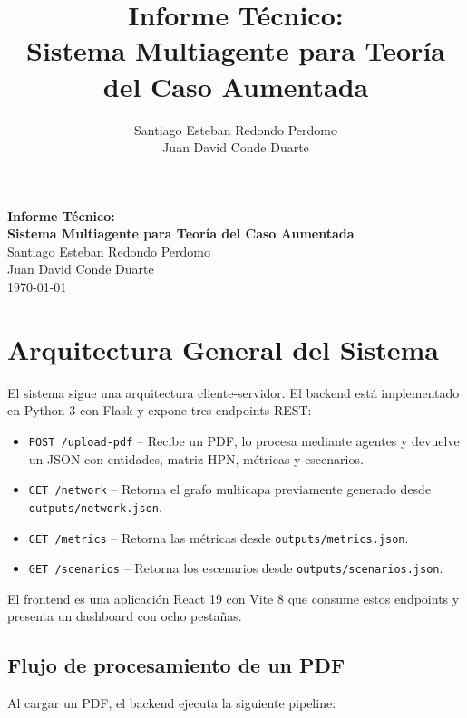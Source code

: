 \documentclass[12pt, letterpaper]{article}
\title{\textbf{Informe Técnico: \\ Sistema Multiagente para Teoría del Caso Aumentada}}
\author{Santiago Esteban Redondo Perdomo \\ Juan David Conde Duarte}
\date{}
\begin{document}
\thispagestyle{empty}
\begin{center}
  \vspace*{2cm}
  {\LARGE\bfseries Informe Técnico: \\[6pt]
  Sistema Multiagente para Teoría del Caso Aumentada}\\[2cm]
  {\large Santiago Esteban Redondo Perdomo \\[4pt]
  Juan David Conde Duarte}\\[1cm]
  {\large \today}
  \vfill
\end{center}
\newpage

\section{Arquitectura General del Sistema}

El sistema sigue una arquitectura cliente-servidor. El backend está
implementado en Python 3 con Flask y expone tres endpoints REST:

\begin{itemize}[nosep]
  \item \texttt{POST /upload-pdf} -- Recibe un PDF, lo procesa
    mediante agentes y devuelve un JSON con entidades, matriz HPN,
    métricas y escenarios.
  \item \texttt{GET /network} -- Retorna el grafo multicapa
    previamente generado desde \texttt{outputs/network.json}.
  \item \texttt{GET /metrics} -- Retorna las métricas desde
    \texttt{outputs/metrics.json}.
  \item \texttt{GET /scenarios} -- Retorna los escenarios desde
    \texttt{outputs/scenarios.json}.
\end{itemize}

El frontend es una aplicación React 19 con Vite 8 que consume estos
endpoints y presenta un dashboard con ocho pestañas.

\subsection{Flujo de procesamiento de un PDF}

\noindent Al cargar un PDF, el backend ejecuta la siguiente pipeline:
\end{document}
